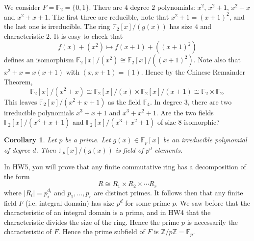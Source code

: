 \documentclass{article}
\def\Z{{\mathbb Z}}
\def\F{{\mathbb F}}
\def\Z{{\mathbb Z}}
\def\F{{\mathbb F}}
\newtheorem{cor}[subsection]{Corollary}
\begin{document}
We consider $F = \F_2 = \{0,1\}$. There are $4$ degree $2$ polynomials: $x^2$, $x^2 + 1$, $x^2 + x$ and $x^2 + x + 1$. The first three are reducible, note that $x^2 + 1 = (x + 1)^2$, and the last one is irreducible. The ring $\F_2[x]/(g(x))$ has size $4$ and characteristic $2$. It is easy to check that
$$f(x) + (x^2)\mapsto f(x+1) + ((x+1)^2)$$ defines an isomorphism $\F_2[x]/(x^2) \cong \F_2[x]/((x+1)^2).$ Note also that $x^2 + x = x(x+1)$ with $(x, x+1) = (1)$. Hence by the Chinese Remainder Theorem, $$\F_2[x]/(x^2 + x) \cong \F_2[x]/(x) \times \F_2[x]/(x+1) \cong \F_2\times\F_2.$$ This leaves $\F_2[x]/(x^2 + x + 1)$ as the field $\F_4$. In degree $3$, there are two irreducible polynomials $x^3 + x + 1$ and $x^3 + x^2 + 1$. Are the two fields $\F_2[x]/(x^3 + x + 1)$ and $\F_2[x]/(x^3 + x^2 + 1)$ of size 8 isomorphic?

\begin{cor}
    Let $p$ be a prime. Let $g(x)\in\F_p[x]$ be an irreducible polynomial of degree $d$. Then $\F_p[x]/(g(x))$ is field of $p^d$ elements.
\end{cor}

In HW5, you will prove that any finite commutative ring has a decomposition of the form $$R\cong R_1\times R_2\times\cdots R_r$$ 
where $|R_i| = p_i^{d_i}$ and $p_1,\ldots,p_r$ are distinct primes. It follows then that any finite field $F$ (i.e. integral domain) has size $p^d$ for some prime $p$. We saw before that the characteristic of an integral domain is a prime, and in HW4 that the characteristic divides the size of the ring. Hence the prime $p$ is necessarily the characteristic of $F$. Hence the prime subfield of $F$ is $\Z/p\Z = \F_p$.
\end{document}
